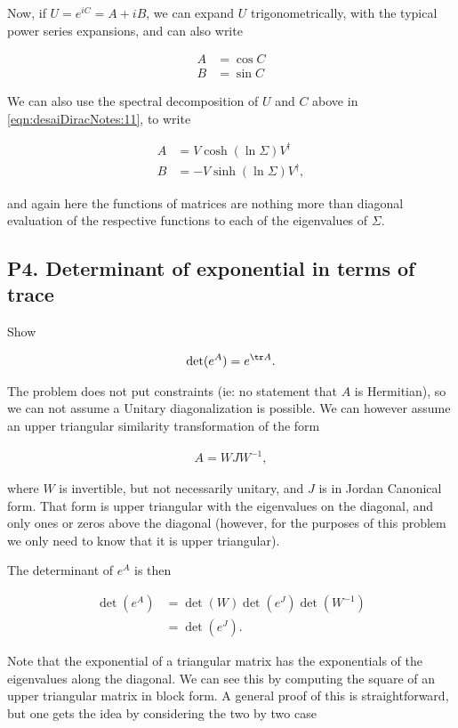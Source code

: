 Now, if $U = e^{iC} = A + iB$, we can expand $U$ trigonometrically, with the typical power series expansions, and can also write

\begin{align*}
A &= \cos C \\
B &= \sin C 
\end{align*}

We can also use the spectral decomposition of $U$ and $C$ above in \ref{eqn:desaiDiracNotes:11}, to write

\begin{align*}
A &= V \cosh(\ln \Sigma) V^\dagger \\
B &= -V \sinh(\ln \Sigma) V^\dagger,
\end{align*}

and again here the functions of matrices are nothing more than diagonal evaluation of the respective functions to each of the eigenvalues of $\Sigma$.

\subsection{P4. Determinant of exponential in terms of trace}

Show 

\begin{align*}
\det (e^A) = e^{\tr A}.
\end{align*}

The problem does not put constraints (ie: no statement that $A$ is Hermitian), so we can not assume a Unitary diagonalization is possible.  We can however assume an upper triangular similarity transformation of the form

\begin{align*}
A = W J W^{-1},
\end{align*}

where $W$ is invertible, but not necessarily unitary, and $J$ is in Jordan Canonical form.  That form is upper triangular with the eigenvalues on the diagonal, and only ones or zeros above the diagonal (however, for the purposes of this problem we only need to know that it is upper triangular).

The determinant of $e^A$ is then

\begin{align*}
\det(e^A) 
&=
\det(W) \det(e^J) \det(W^{-1}) \\
&=
\det(e^J).
\end{align*}

Note that the exponential of a triangular matrix has the exponentials of the eigenvalues along the diagonal.  We can see this by computing the square of an upper triangular matrix in block form.  A general proof of this is straightforward, but one gets the idea by considering the two by two case

